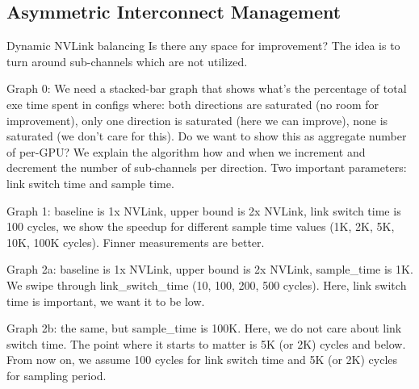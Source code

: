 \subsection{Asymmetric Interconnect Management}
\label{interconnect}

Dynamic NVLink balancing Is there any space for improvement? The idea is to turn 
around sub-channels which are not utilized. 

Graph 0: We need a stacked-bar graph that shows what’s the percentage of total 
exe time spent in configs where: both directions are saturated (no room for 
improvement), only one direction is saturated (here we can improve), none is 
saturated (we don’t care for this). Do we want to show this as aggregate number 
of per-GPU?
We explain the algorithm how and when we increment and decrement the number of 
sub-channels per direction. Two important parameters: link switch time and 
sample time.

Graph 1: baseline is 1x NVLink, upper bound is 2x NVLink, link switch time is 
100 cycles, we show the speedup for different sample time values (1K, 2K, 5K, 
10K, 100K cycles). Finner measurements are better.

Graph 2a: baseline is 1x NVLink, upper bound is 2x NVLink, sample\_time is 1K. 
We swipe through link\_switch\_time (10, 100, 200, 500 cycles). Here, link 
switch time is important, we want it to be low.

Graph 2b: the same, but sample\_time is 100K. Here, we do not care about link 
switch time. The point where it starts to matter is 5K (or 2K) cycles and below. 
From now on, we assume 100 cycles for link switch time and 5K (or 2K) cycles for 
sampling period.


